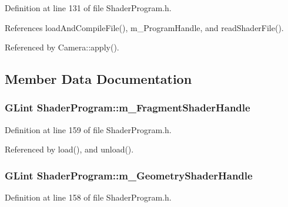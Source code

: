 Definition at line 131 of file Shader\+Program.\+h.



References load\+And\+Compile\+File(), m\+\_\+\+Program\+Handle, and read\+Shader\+File().



Referenced by Camera\+::apply().



\subsection{Member Data Documentation}
\subsubsection[{\texorpdfstring{m\+\_\+\+Fragment\+Shader\+Handle}{m_FragmentShaderHandle}}]{\setlength{\rightskip}{0pt plus 5cm}G\+Lint Shader\+Program\+::m\+\_\+\+Fragment\+Shader\+Handle\hspace{0.3cm}{\ttfamily [private]}}\hypertarget{class_shader_program_a8fe8505db597cb168b538df824d03906}{}\label{class_shader_program_a8fe8505db597cb168b538df824d03906}


Definition at line 159 of file Shader\+Program.\+h.



Referenced by load(), and unload().

\subsubsection[{\texorpdfstring{m\+\_\+\+Geometry\+Shader\+Handle}{m_GeometryShaderHandle}}]{\setlength{\rightskip}{0pt plus 5cm}G\+Lint Shader\+Program\+::m\+\_\+\+Geometry\+Shader\+Handle\hspace{0.3cm}{\ttfamily [private]}}\hypertarget{class_shader_program_ac9959fc7ce96370c40c1422e7d104a44}{}\label{class_shader_program_ac9959fc7ce96370c40c1422e7d104a44}


Definition at line 158 of file Shader\+Program.\+h.




